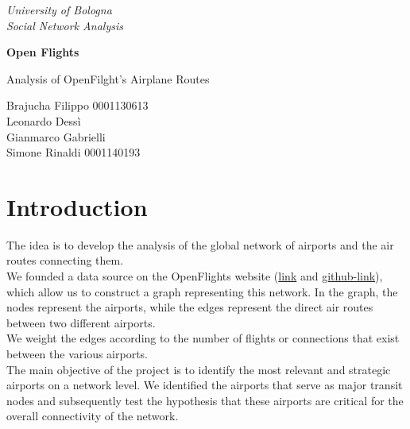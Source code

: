 \documentclass[12pt]{article}
\begin{document}
\begin{titlepage}

\begin{center}
    { \textit{University of Bologna} }\\
    \vspace{5mm}
    { \textit{Social Network Analysis} }\\
\end{center}

\vspace{20mm}

\begin{center}
    {\LARGE{\bf Open Flights}}\\
\end{center}

\vspace{20mm}

\begin{center}
    {\LARGE{Analysis of OpenFilght's Airplane Routes}}\\
\end{center}

\vspace{30mm}

\begin{center}
    {\large{Brajucha Filippo 0001130613\\}}
    \vspace{5mm}
    {\large{Leonardo Dessì \\}}
    \vspace{5mm}
    {\large{Gianmarco Gabrielli  \\}}
    \vspace{5mm}
    {\large{Simone Rinaldi 0001140193\\}}
\end{center}

\vspace{40mm}

\end{titlepage}

\tableofcontents
\newpage
\section{Introduction}
The idea is to develop the analysis of the global network of airports and the air routes connecting them. \\
We founded a data source on the OpenFlights website (\hyperlink{https://openflights.org/}{link} and \hyperlink{https://github.com/jpatokal/openflights}{github-link}), which allow us to construct a graph representing this network. In the graph, the nodes represent the airports, while the edges represent the direct air routes between two different airports.\\ 
We weight the edges according to the number of flights or connections that exist between the various airports.\\
The main objective of the project is to identify the most relevant and strategic airports on a network level. We identified the airports that serve as major transit nodes and subsequently test the hypothesis that these airports are critical for the overall connectivity of the network.
\end{document}
